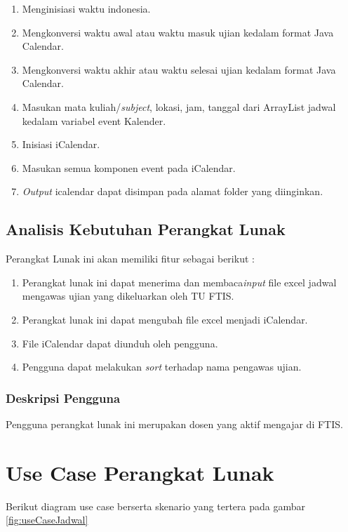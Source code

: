 \begin{enumerate}
	\item Menginisiasi waktu indonesia.
	\item Mengkonversi waktu awal atau waktu masuk ujian kedalam format Java Calendar.
	\item Mengkonversi waktu akhir atau waktu selesai ujian kedalam format Java Calendar.
	\item Masukan mata kuliah/\textit{subject}, lokasi, jam, tanggal dari ArrayList jadwal kedalam variabel event Kalender.
	\item Inisiasi iCalendar.
	\item Masukan semua komponen event pada iCalendar.
	\item \textit{Output} icalendar dapat disimpan pada alamat folder yang diinginkan.
\end{enumerate}

\subsection{Analisis Kebutuhan Perangkat Lunak}
Perangkat Lunak ini akan memiliki fitur sebagai berikut : 
	\begin{enumerate}
		\item Perangkat lunak ini dapat menerima dan membaca\textit{input} file excel jadwal mengawas ujian yang dikeluarkan oleh TU FTIS.
		\item Perangkat lunak ini dapat mengubah file excel menjadi iCalendar.
		\item File iCalendar dapat diunduh oleh pengguna.
		\item Pengguna dapat melakukan \textit{sort} terhadap nama pengawas ujian.
	\end{enumerate}

\subsubsection{Deskripsi Pengguna}
Pengguna perangkat lunak ini merupakan dosen yang aktif mengajar di FTIS.
	
\section{Use Case Perangkat Lunak}

Berikut diagram use case berserta skenario yang tertera pada gambar \ref{fig:useCaseJadwal}

